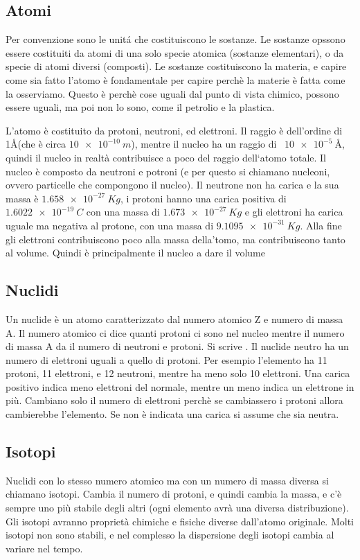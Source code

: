 \documentclass[a4paper]{article}
\begin{document}
\subsection{Atomi}
Per convenzione sono le unitá che costituiscono le sostanze. Le sostanze opssono essere costituiti da atomi di una solo specie atomica (sostanze elementari), o da specie di atomi diversi (composti). Le sostanze costituiscono la materia, e capire come sia fatto l'atomo è fondamentale per capire perchè la materie è fatta come la osserviamo. Questo è perchè cose uguali dal punto di vista chimico, possono essere uguali, ma poi non lo sono, come il petrolio e la plastica. 

L'atomo è costituito da protoni, neutroni, ed elettroni. Il raggio è dell'ordine di 1\AA (che è circa $\SI{10e-10}{m}$), mentre il nucleo ha un raggio di ~$\SI{10e-5}{\text{\AA}}$, quindi il nucleo in realtà contribuisce a poco del raggio dell`atomo totale. Il nucleo è composto da neutroni e potroni (e per questo si chiamano nucleoni, ovvero particelle che compongono il nucleo). Il neutrone non ha carica e la sua massa è $\SI{1.658e-27}{Kg}$, i protoni hanno una carica positiva di $\SI{1,6022e-19}{C}$ con una massa di $\SI{1,673e-27}{Kg}$ e gli elettroni ha carica uguale ma negativa al protone, con una massa di $\SI{9,1095e-31}{Kg}$. Alla fine gli elettroni contribuiscono poco alla massa della'tomo, ma contribuiscono tanto al volume. Quindi è principalmente il nucleo a dare il volume

\subsection{Nuclidi}
Un nuclide è un atomo caratterizzato dal numero atomico Z e numero di massa A. Il numero atomico ci dice quanti protoni ci sono nel nucleo mentre il numero di massa A da il numero di neutroni e protoni. Si scrive . Il nuclide neutro ha un numero di elettroni uguali a quello di protoni. Per esempio l'elemento  ha 11 protoni, 11 elettroni, e 12 neutroni, mentre  ha meno solo 10 elettroni. Una carica positivo indica meno elettroni del normale, mentre un meno indica un elettrone in più. Cambiano solo il numero di elettroni perchè se cambiassero i protoni allora cambierebbe l'elemento. Se non è indicata una carica si assume che sia neutra. 

\subsection{Isotopi}
Nuclidi con lo stesso numero atomico ma con un numero di massa diversa si chiamano isotopi. Cambia il numero di protoni, e quindi cambia la massa, e c'è sempre uno più stabile degli altri (ogni elemento avrà una diversa distribuzione). Gli isotopi avranno proprietà chimiche e fisiche diverse dall'atomo originale. Molti isotopi non sono stabili, e nel complesso la dispersione degli isotopi cambia al variare nel tempo.
\end{document}
